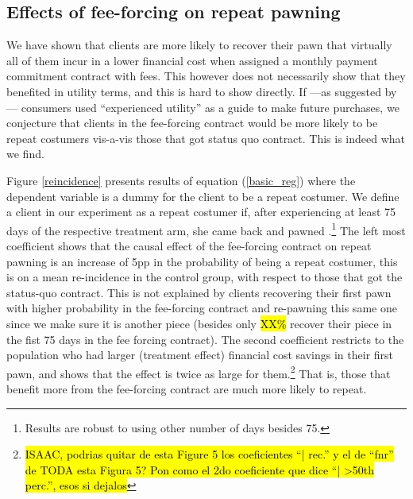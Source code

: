 \documentclass[11pt]{article}
\begin{document}
\subsection{Effects of fee-forcing on repeat pawning}

We have shown that clients are more likely to recover their pawn that virtually all of them incur in a lower financial cost  when assigned a monthly payment commitment contract with fees. This however does not necessarily show that they benefited in utility terms, and this is hard to show directly. If ---as suggested by \cite{Laibson2018}--- consumers used ``experienced utility'' as a guide to make future purchases, we conjecture that clients in the fee-forcing contract would be more likely to be repeat costumers vis-a-vis those that got status quo contract. This is indeed what we find. 

Figure \ref{reincidence} presents results of equation (\ref{basic_reg}) where the dependent variable is a dummy for the client to be a repeat costumer. We define a client in our experiment as a repeat costumer if, after experiencing at least 75 days of the respective treatment arm, she came back and pawned .\footnote{Results are robust to using other number of days besides 75.}  The left most coefficient shows that the causal effect of the fee-forcing contract on repeat pawning is an increase of 5pp in the probability of being a repeat costumer, this is  on a mean re-incidence in the control group, with respect to those that got the status-quo contract. This is not explained by clients recovering their first pawn with higher probability in the fee-forcing contract and re-pawning this same one since we make sure it is another piece (besides only \hl{XX\%} recover their piece in the fist 75 days in the fee forcing contract). The second coefficient restricts to the population who had larger (treatment effect) financial cost savings in their first pawn, and shows that the effect is twice as large for them.\footnote{\hl{ISAAC, podrias quitar de esta Figure 5 los coeficientes ``| rec.'' y el de ``fnr'' de TODA esta Figura 5?  Pon como el 2do coeficiente que dice ``| >50th perc.'', esos si dejalos}} That is, those that benefit more from the fee-forcing contract are much more likely to repeat. %
\end{document}
